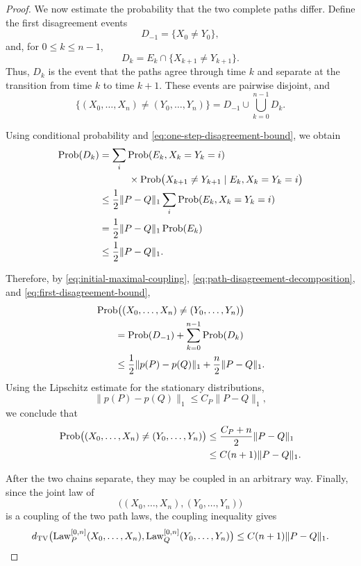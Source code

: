 \documentclass[11pt,a4paper]{amsart}
\theoremstyle{definition}
\theoremstyle{remark}
\numberwithin{equation}{section}
\newcommand{\Prob}{\operatorname{Prob}}
\newcommand{\Law}{\operatorname{Law}}
\newcommand{\1}{\boldsymbol 1}
\begin{document}
\begin{proof}
We now estimate the probability that the two complete paths differ.
Define the first disagreement events
$$
 D_{-1}=\{X_0\ne Y_0\},
$$
and, for $0\le k\le n-1$,
$$
 D_k
 =
 E_k\cap\{X_{k+1}\ne Y_{k+1}\}.
$$
Thus, $D_k$ is the event that the paths agree through time $k$ and
separate at the transition from time $k$ to time $k+1$.  These
events are pairwise disjoint, and
\begin{equation}\label{eq:path-disagreement-decomposition}
 \bigl\{
   (X_0,\ldots,X_n)\ne(Y_0,\ldots,Y_n)
 \bigr\}
 =
 D_{-1}\cup\bigcup_{k=0}^{n-1}D_k.
\end{equation}

Using conditional probability and
\eqref{eq:one-step-disagreement-bound}, we obtain
\begin{align}
 \Prob(D_k)
 &=
 \sum_i
 \Prob(E_k,X_k=Y_k=i)
 \notag\\
 &\qquad\quad\times
 \Prob\bigl(
   X_{k+1}\ne Y_{k+1}
   \mid E_k,X_k=Y_k=i
 \bigr)
 \notag\\
 &\le
 \frac12\|P-Q\|_1
 \sum_i\Prob(E_k,X_k=Y_k=i)
 \notag\\
 &=
 \frac12\|P-Q\|_1\Prob(E_k)
 \notag\\
 &\le
 \frac12\|P-Q\|_1.
 \label{eq:first-disagreement-bound}
\end{align}

Therefore, by \eqref{eq:initial-maximal-coupling},
\eqref{eq:path-disagreement-decomposition}, and
\eqref{eq:first-disagreement-bound},
\begin{align}
 &\Prob\bigl(
   (X_0,\ldots,X_n)\ne(Y_0,\ldots,Y_n)
 \bigr)
 \notag\\
 &\qquad
 =
 \Prob(D_{-1})
 +\sum_{k=0}^{n-1}\Prob(D_k)
 \notag\\
 &\qquad
 \le
 \frac12\|p(P)-p(Q)\|_1
 +\frac n2\|P-Q\|_1.
 \label{eq:path-disagreement-expanded}
\end{align}
Using the Lipschitz estimate for the stationary distributions,
$$
 \|p(P)-p(Q)\|_1
 \le C_P\|P-Q\|_1,
$$
we conclude that
\begin{align}
 \Prob\bigl(
   (X_0,\ldots,X_n)\ne(Y_0,\ldots,Y_n)
 \bigr)
 &\le
 \frac{C_P+n}{2}\|P-Q\|_1
 \notag\\
 &\le
 C(n+1)\|P-Q\|_1.
 \label{eq:path-coupling-expanded}
\end{align}

After the two chains separate, they may be coupled in an arbitrary
way. %
%
Finally, since the joint law of
$$
 \bigl((X_0,\ldots,X_n),(Y_0,\ldots,Y_n)\bigr)
$$
is a coupling of the two path laws, the coupling inequality gives
$$
 d_{\rm TV}\bigl(
   \Law_P^{[0,n]}(X_0,\ldots,X_n),
   \Law_Q^{[0,n]}(Y_0,\ldots,Y_n)
 \bigr)
 \le
 C(n+1)\|P-Q\|_1.
$$



\end{proof}
\end{document}

